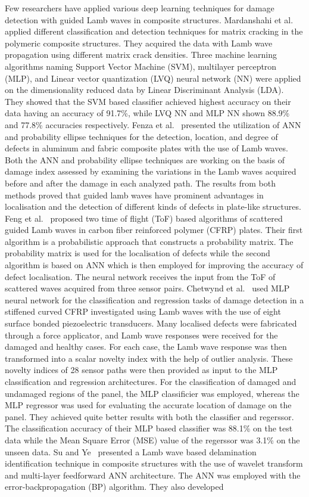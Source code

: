 Few researchers have applied various deep learning techniques for damage detection with guided Lamb waves in composite structures. Mardanshahi et al.~\cite{mardanshahi2020detection} applied different classification and detection techniques for matrix cracking in the polymeric composite structures. They acquired the data with Lamb wave propagation using different matrix crack densities. Three machine learning algorithms naming Support Vector Machine (SVM), multilayer perceptron (MLP), and Linear vector quantization (LVQ) neural network (NN) were applied on the dimensionality reduced data by Linear Discriminant Analysis (LDA). They showed that the SVM based classifier achieved highest accuracy on their data having an accuracy of 91.7\%, while LVQ NN and MLP NN shown 88.9\% and 77.8\% accuracies respectively. Fenza et al.~\cite{de2015application} presented the utilization of ANN and probability ellipse techniques for the detection, location, and degree of defects in aluminum and fabric composite plates with the use of Lamb waves. Both the ANN and probability ellipse techniques are working on the basis of damage index assessed by examining the variations in the Lamb waves acquired before and after the damage in each analyzed path. The results from both methods proved that guided lamb waves have prominent advantages in localisation and the detection of different kinds of defects in plate-like structures. Feng et al.~\cite{feng2019locating} proposed two time of flight (ToF) based algorithms of scattered guided Lamb waves in carbon fiber reinforced polymer (CFRP) plates. Their first algorithm is a probabilistic approach that constructs a probability matrix. The probability matrix is used for the localisation of defects while the second algorithm is based on ANN which is then employed for improving the accuracy of defect localisation. The neural network receives the input from the ToF of scattered waves acquired from three sensor pairs. Chetwynd et al.~\cite{chetwynd2008damage} used MLP neural network for the classification and regression tasks of damage detection in a stiffened curved CFRP investigated using Lamb waves with the use of eight surface bonded piezoelectric transducers. Many localised defects were fabricated through a force applicator, and Lamb wave responses were received for the damaged and healthy cases. For each case, the Lamb wave response was then transformed into a scalar novelty index with the help of outlier analysis. These novelty indices of 28 sensor paths were then provided as input to the MLP classification and regression architectures. For the classification of damaged and undamaged regions of the panel, the MLP classificier was employed, whereas the MLP regressor was used for evaluating the accurate location of damage on the panel. They achieved quite better results with both the classifier and regerssor. The classification accuracy of their MLP based classifier was 88.1\% on the test data while the Mean Square Error (MSE) value of the regerssor was 3.1\% on the unseen data. Su and Ye~\cite{su2004lamb} presented a Lamb wave based delamination identification technique in composite structures with the use of wavelet transform and multi-layer feedforward ANN architecture. The ANN was employed with the error-backpropagation (BP) algorithm. They also developed 